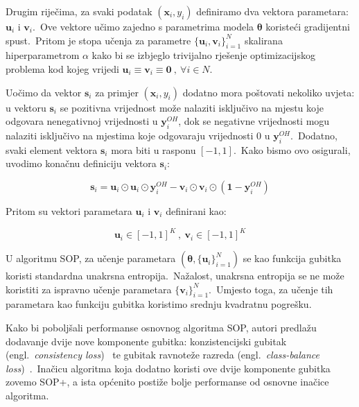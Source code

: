 \documentclass[diplomskirad]{fer}
\begin{document}
\pagebreak

Drugim riječima, za svaki podatak $(\bm{x}_i, y_i)$ definiramo dva vektora parametara: $\bm{u}_i$ i $\bm{v}_i$.\ 
Ove vektore učimo zajedno s parametrima modela $\bm{\theta}$ koristeći gradijentni spust.\ 
Pritom je stopa učenja za parametre $\{\bm{u}_i,\bm{v}_i\}_{i=1}^N$ skalirana hiperparametrom $\alpha$ kako bi se izbjeglo trivijalno rješenje optimizacijskog problema kod kojeg vrijedi $\bm{u}_i \equiv \bm{v}_i \equiv \bm{0}\:,\:\forall i \in N$.\ 

Uočimo da vektor $\bm{s}_i$ za primjer $(\bm{x}_i, y_i)$ dodatno mora poštovati nekoliko uvjeta: u vektoru $\bm{s}_i$ se pozitivna vrijednost može nalaziti isključivo na mjestu koje odgovara nenegativnoj vrijednosti u $\bm{y}_i^{OH}$, dok se negativne vrijednosti mogu nalaziti isključivo na mjestima koje odgovaraju vrijednosti $0$ u $\bm{y}_i^{OH}$.\ 
Dodatno, svaki element vektora $\bm{s}_i$ mora biti u rasponu $\left[ -1, 1 \right]$.\ Kako bismo ovo osigurali, uvodimo konačnu definiciju vektora $\bm{s}_i$:

\begin{equation}
  \bm{s}_i = \bm{u}_i \odot \bm{u}_i \odot \bm{y}_i^{OH} - \bm{v}_i \odot \bm{v}_i \odot (\bm{1} - \bm{y}_i^{OH})
  \label{eq:sop_s2}
\end{equation}

Pritom su vektori parametara $\bm{u}_i$ i $\bm{v}_i$ definirani kao:

\begin{equation}
  \bm{u}_i \in \left[ -1, 1 \right]^K\:,\:\bm{v}_i \in \left[ -1, 1 \right]^K
  \label{eq:sop_u,i}
\end{equation}

U algoritmu SOP, za učenje parametara $(\bm{\theta}, \{\bm{u}_i\}_{i=1}^N)$ se kao funkcija gubitka koristi standardna unakrsna entropija.\ Nažalost, unakrsna entropija se ne može koristiti za ispravno učenje parametara $\{\bm{v}_i\}_{i=1}^N$.\ 
Umjesto toga, za učenje tih parametara kao funkciju gubitka koristimo srednju kvadratnu pogrešku.\ 

Kako bi poboljšali performanse osnovnog algoritma SOP, autori predlažu dodavanje dvije nove komponente gubitka: konzistencijski gubitak (engl.\ \textit{consistency loss})~\cite{berthelot2019mixmatch} te gubitak ravnoteže razreda (engl.\ \textit{class-balance loss})~\cite{tanaka2018joint}.\ 
Inačicu algoritma koja dodatno koristi ove dvije komponente gubitka zovemo SOP+, a ista općenito postiže bolje performanse od osnovne inačice algoritma.\
\end{document}
